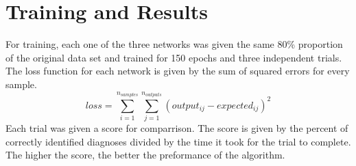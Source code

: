 \documentclass[12pt]{article}
\begin{document}
\section{Training and Results}
    For training, each one of the three networks was given the same 80\% proportion of the original data set and trained for
        150 epochs and three independent trials.
    The loss function for each network is given by the sum of squared errors for every sample.
    \begin{equation}\label{sumSquaredErrs}
        loss = \sum_{i=1}^{n_{samples}} \sum_{j=1}^{n_{outputs}} (output_{ij} - expected_{ij})^2
    \end{equation}
    Each trial was given a score for comparrison.  The score is given by the percent of correctly identified diagnoses divided by the time it took for the
    trial to complete.  The higher the score, the better the preformance of the algorithm.
    \pagebreak
    
\end{document}
